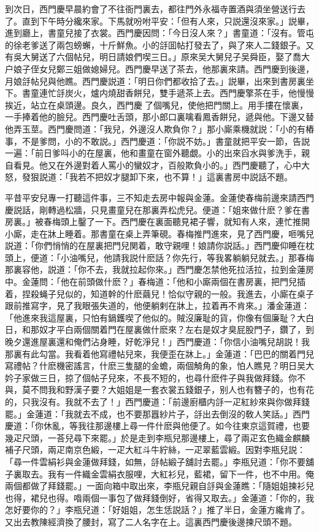 到次日，西門慶早晨約會了不往衙門裏去，都往門外永福寺置酒與須坐營送行去了。直到下午時分纔來家。下馬就吩咐平安：「但有人來，只説還沒來家。」説畢，進到廳上，書童兒接了衣裳。西門慶因問：「今日沒人來？」書童道：「沒有。管屯的徐老爹送了兩包螃蠏，十斤鮮魚。小的㧱囬帖打發去了，與了來人二錢銀子。又有吳大舅送了六個帖兒，明日請娘們喫三日。」原來吴大舅兒子吴舜臣，娶了喬大户娘子侄女兒鄭三姐做媳婦兒。西門慶早送了茶去，他那裏來請。西門慶到後邊，月娘㧱帖兒與他瞧。西門慶説道：「明日你們都收拾了去。」説畢，出來到書房裏坐下。書童連忙㧱炭火，爐内燒甜香餅兒，雙手遞茶上去。西門慶擎茶在手，他慢慢挨近，站立在桌頭邊。良久，西門慶𢫓了個嘴兒，使他把門關上。用手摟在懷裏，一手捧着他的臉兒。西門慶吐舌頭，那小郎口裏噙看鳳香餅兒，遞與他。下邊又替他弄玉莖。西門慶問道：「我兒，外邊沒人欺負你？」那小廝乘機就説：「小的有樁事，不是爹問，小的不敢説。」西門慶道：「你説不妨。」書童就把平安一節，告説一遍：「前日爹呌小的在屋裏，他和畫童在窗外聽覷。小的出來舀水與爹洗手，親自看見。他又在外邊對着人罵小的蠻奴才，百般欺負小的。」西門慶聽了，心中大怒，發狠説道：「我若不把奴才腿卸下來，也不算！」這裏書房中説話不題。

平昔平安兒專一打聽這件事，三不知走去房中報與金蓮。金蓮使春梅前邊來請西門慶説話，剛轉過松牆，只見畫童兒在那裏弄松虎兒。便道：「姐來做什麽？爹在書房裏。」被春梅頭上鑿了一下。西門慶在裏面聽見裙子響，就知有人來，連忙推開小廝，走在牀上睡着。那書童在桌上弄筆硯。春梅推門進來，見了西門慶，咂嘴兒説道：「你們悄悄的在屋裏把門兒関着，敢守親哩！娘請你説話。」西門慶仰睡在枕頭上，便道：「小油嘴兒，他請我説什麽話？你先行，等我畧躺躺兒就去。」那春梅那裏容他，説道：「你不去，我就拉起你來。」西門慶怎禁他死拉活拉，拉到金蓮房中。金蓮問：「他在前頭做什麽？」春梅道：「他和小廝兩個在書房裏，把門兒插着，捏殺蝇子兒似的，知道幹的什麽繭兒！恰似守親的一般。我進去，小廝在桌子跟前推寫字，見了我眼張失道的，他便躺剌在牀上，拉着再不肯來。」潘金蓮道：「他進來我這屋裏，只怕有鍋鑊喫了他似的。賊沒廉耻的貨，你像有個廉耻？大白日，和那奴才平白兩個關着門在屋裏做什麽來？左右是奴才臭屁股門子，鑽了，到晚夕還進屋裏還和俺們沾身睡，好乾淨兒！」西門慶道：「你信小油嘴兒胡説！我那裏有此勾當。我看着他寫禮帖兒來，我便歪在牀上。」金蓮道：「巴巴的關着門兒寫禮帖？什麽機密謠言，什麽三隻腿的金蟾，兩個觭角的象，怕人瞧見？明日吴大妗子家做三日，掠了個帖子兒來，不長不短的，也尋什麽件子與我做拜錢。你不與，莫不問我和野漢子要？大姐姐是一套衣裳五錢銀子，别人也有簪子的，也有花的，只我沒有。我就不去了！」西門慶道：「前邊廚櫃内㧱一疋紅紗來與你做拜錢罷。」金蓮道：「我就去不成，也不要那囂紗片子，㧱出去倒沒的敎人笑話。」西門慶道：「你休亂，等我往那邊樓上尋一件什麽與他便了。如今往東京這賀禮，也要幾疋尺頭，一荅兒尋下來罷。」於是走到李瓶兒那邊樓上，尋了兩疋玄色織金麒麟補子尺頭，兩疋南京色緞，一疋大紅斗牛紵絲，一疋翠藍雲緞。因對李瓶兒説：「尋一件雲絹衫與金蓮做拜錢，如無，㧱帖緞子舖討去罷。」李瓶兒道：「你不要舖子裏取去。我有一件織金雲絹衣服哩，大紅衫兒，藍裙，留下一件，也不中用。俺兩個都做了拜錢罷。」一面向箱中取出來，李瓶兒親自㧱與金蓮瞧：「隨姐姐揀衫兒也得，裙兒也得。喒兩個一事包了做拜錢倒好，省得又取去。」金蓮道：「你的，我怎好要你的？」李瓶兒道：「好姐姐，怎生恁説話？」推了半日，金蓮方纔肯了。又出去教陳經濟換了腰封，寫了二人名字在上。這裏西門慶後邊揀尺頭不題。

